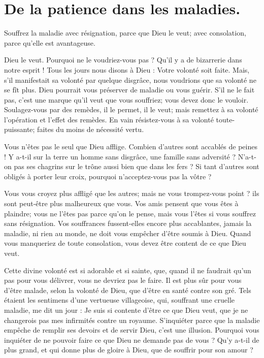 \documentclass[instructions.tex]{subfiles}
\begin{document}
 
\chapter{De la patience dans les maladies.}
 
Souffrez la maladie avec résignation, parce que Dieu le veut; avec consolation, parce qu’elle est avantageuse.
 
\primo Dieu le veut. Pourquoi ne le voudriez-vous pas ? Qu’il y a de bizarrerie dans notre esprit ! Tous les jours nous disons à Dieu : Votre volonté soit faite. Mais, s’il manifestait sa volonté par quelque disgrâce, nous voudrions que sa volonté ne se fît plus. Dieu pourrait vous préserver de maladie ou vous guérir. S’il ne le fait pas, c’est une marque qu’il veut que vous souffriez; vous devez donc le vouloir. Soulagez-vous par des remèdes, il le permet, il le veut; mais remettez à sa volonté l’opération et l’effet des remèdes. En vain résistez-vous à sa volonté toute-puissante; faites du moins de nécessité vertu.
 
Vous n’êtes pas le seul que Dieu afflige. Combien d’autres sont accablés de peines ! Y a-t-il sur la terre un homme sans disgrâce, une famille sans adversité ? N’a-t-on pas ses chagrins sur le trône aussi bien que dans les fers ? Si tant d’autres sont obligés à porter leur croix, pourquoi n’acceptez-vous pas la vôtre ?
 
Vous vous croyez plus affligé que les autres; mais ne vous trompez-vous point ? ils sont peut-être plus malheureux que vous. Vos amis pensent que vous êtes à plaindre; vous ne l’êtes pas parce qu’on le pense, mais vous l’êtes si vous souffrez sans résignation. Vos souffrances fussent-elles encore plus accablantes, jamais la maladie, ni rien au monde, ne doit vous empêcher d’être soumis à Dieu. Quand vous manqueriez de toute consolation, vous devez être content de ce que Dieu veut.
 
Cette divine volonté est si adorable et si sainte, que, quand il ne faudrait qu’un pas pour vous délivrer, vous ne devriez pas le faire. Il est plus sûr pour vous d’être malade, selon la volonté de Dieu, que d’être en santé contre son gré. Tels étaient les sentimens d’une vertueuse villageoise, qui, souffrant une cruelle maladie, me dit un jour : Je suis si contente d’être ce que Dieu veut, que je ne changerois pas mes infirmités contre un royaume. S’inquiéter parce que la maladie empêche de remplir ses devoirs et de servir Dieu, c’est une illusion. Pourquoi vous inquiéter de ne pouvoir faire ce que Dieu ne demande pas de vous ? Qu’y a-t-il de plus grand, et qui donne plus de gloire à Dieu, que de souffrir pour son amour ?
 
\end{document}

